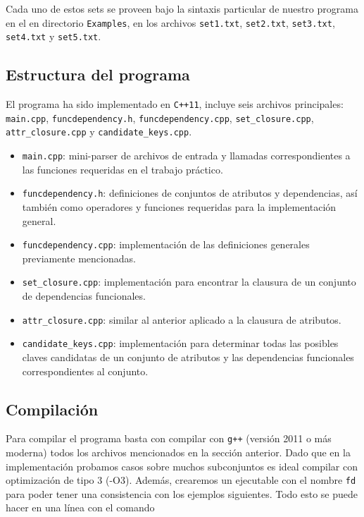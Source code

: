 \documentclass{article}
\begin{document}
Cada uno de estos sets se proveen bajo la sintaxis particular de nuestro programa en el en directorio \verb|Examples|, en los archivos \verb|set1.txt|, \verb|set2.txt|, \verb|set3.txt|, \verb|set4.txt| y \verb|set5.txt|.

\subsection{Estructura del programa}
El programa ha sido implementado en \verb|C++11|, incluye seis archivos principales: \verb|main.cpp|, \verb|funcdependency.h|, \verb|funcdependency.cpp|, \verb|set_closure.cpp|, \verb|attr_closure.cpp| y \verb|candidate_keys.cpp|.

\begin{itemize}
    \item \verb|main.cpp|: mini-parser de archivos de entrada y llamadas correspondientes
    a las funciones requeridas en el trabajo práctico.
    \item \verb|funcdependency.h|: definiciones de conjuntos de atributos y dependencias, así también como operadores y funciones requeridas para la implementación general.
    \item \verb|funcdependency.cpp|: implementación de las definiciones generales previamente mencionadas.
    \item \verb|set_closure.cpp|: implementación para encontrar la clausura de un conjunto de dependencias funcionales.
    \item \verb|attr_closure.cpp|: similar al anterior aplicado a la clausura de atributos.
    \item \verb|candidate_keys.cpp|: implementación para determinar todas las posibles claves candidatas de un conjunto de atributos y las dependencias funcionales correspondientes al conjunto.
\end{itemize}

\subsection{Compilación}
Para compilar el programa basta con compilar con \texttt{g++} (versión 2011 o más moderna) todos los archivos mencionados en la sección anterior. Dado que en la implementación probamos casos sobre muchos subconjuntos es ideal compilar con optimización de tipo 3 (-O3). Además, crearemos un ejecutable con el nombre \verb|fd| para poder tener una consistencia con los ejemplos siguientes. Todo esto se puede hacer en una línea con el comando
\end{document}
